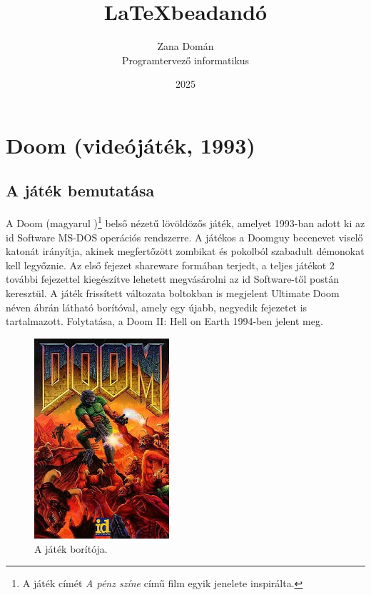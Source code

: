 \documentclass{thesis-ekf}
\theoremstyle{definition}
\theoremstyle{remark}
\begin{document}
\title{\LaTeX beadandó}
\author{Zana Domán\\Programtervező informatikus}
\date{2025}
\maketitle

\tableofcontents

\chapter{Doom (videójáték, 1993)}

\section{A játék bemutatása}

A Doom (magyarul )\footnote{A játék címét \textit{A pénz színe}
című film egyik jenelete inspirálta.} belső nézetű lövöldözős játék, amelyet
1993-ban adott ki az id Software MS-DOS operációs rendszerre. A játékos a
Doomguy becenevet viselő katonát irányítja, akinek megfertőzött zombikat és
pokolból szabadult démonokat kell legyőznie. Az első fejezet shareware formában
terjedt, a teljes játékot 2 további fejezettel kiegészítve lehetett megvásárolni
az id Software-től postán keresztül. A játék frissített változata boltokban is
megjelent Ultimate Doom néven  ábrán látható borítóval, amely
egy újabb, negyedik fejezetet is tartalmazott. Folytatása, a Doom II: Hell on
Earth 1994-ben jelent meg. \cite[Bevezető]{doomgame}

\begin{figure}[h]
    \centering
    \includegraphics[width=5cm]{doom.jpg}
    \caption{A játék borítója.}
    \label{fig:borito}
\end{figure}
\end{document}
